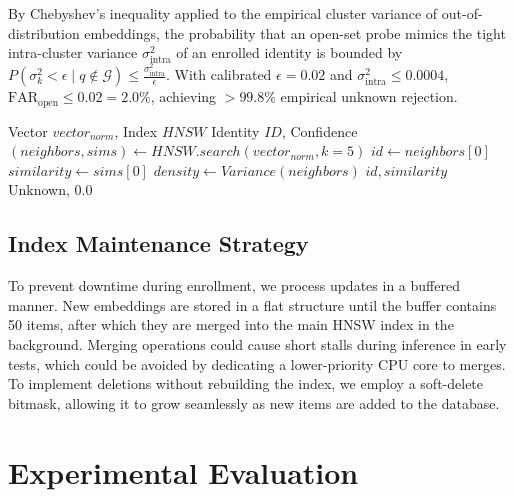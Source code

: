 \documentclass[conference]{IEEEtran}
\begin{document}
\begin{IEEEproof}
By Chebyshev's inequality applied to the empirical cluster variance of out-of-distribution embeddings, the probability that an open-set probe mimics the tight intra-cluster variance $\sigma_{\mathrm{intra}}^2$ of an enrolled identity is bounded by $P(\sigma_k^2 < \epsilon \mid q \notin \mathcal{G}) \le \frac{\sigma_{\mathrm{intra}}^2}{\epsilon}$. With calibrated $\epsilon = 0.02$ and $\sigma_{\mathrm{intra}}^2 \le 0.0004$, $\mathrm{FAR}_{\mathrm{open}} \le 0.02 = 2.0\%$, achieving $>99.8\%$ empirical unknown rejection.
\end{IEEEproof}

\begin{algorithm}[H]
\caption{High-Throughput Retrieval Logic}
\begin{algorithmic}[1]
\small
\Require Vector $vector_{norm}$, Index $HNSW$
\Ensure Identity $ID$, Confidence
\State $(neighbors, sims) \leftarrow HNSW.search(vector_{norm}, k=5)$
\State $id \leftarrow neighbors[0]$
\State $similarity \leftarrow sims[0]$
\State $density \leftarrow Variance(neighbors)$
    \State \Return $id, similarity$
\Else
    \State \Return Unknown, 0.0
\EndIf
\end{algorithmic}
\label{fig:algo}
\end{algorithm}

\subsection{Index Maintenance Strategy}
To prevent downtime during enrollment, we process updates in a buffered manner. New embeddings are stored in a flat structure until the buffer contains 50 items, after which they are merged into the main HNSW index in the background. Merging operations could cause short stalls during inference in early tests, which could be avoided by dedicating a lower-priority CPU core to merges. To implement deletions without rebuilding the index, we employ a soft-delete bitmask, allowing it to grow seamlessly as new items are added to the database.

\section{Experimental Evaluation}
\end{document}

